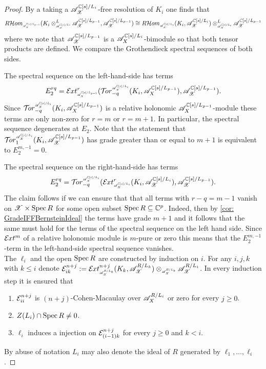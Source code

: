 \begin{proof}
  By a taking a $\mathscr{A}_{\mathscr{X}}^{\mathbb{C}[s]/L_{i}}$-free resolution of $K_i$ one finds that
  $$R \Hom_{\scaleto{\A_\X^{ \C[s]/L_{p-1} }}{8pt} }(K_i\otimes^L_{\scaleto{ \A_\X^{\C[s]/L{i}} }{8pt} } \A_\X^{\C[s]/L_{p-1} },\A_\X^{ \C[s]/L_{p-1}} ) \cong R \Hom_{ \scaleto{\A_\X^{\C[s]/L_{i}}}{8pt} } (K_i,\A_\X^{\C[s]/L_{i}}) \otimes^L_{\scaleto{ \A_\X^{\C[s]/L_{i}}}{8pt} } \A_\X^{\C[s]/L_{p-1}}$$
  where we note that $\mathscr{A}_{\mathscr{X}}^{\mathbb{C}[s]/L_{p-1}}$ is a $\mathscr{A}_X^{\mathbb{C}[s]/L_{i}}$-bimodule so that both tensor products are defined.
  We compare the Grothendieck spectral sequences of both sides.

  The spectral sequence on the left-hand-side has terms
  $$E^{rq}_2 = \Ex{\A_\X^{\C[s]/L_{p-1}}}{r}(\Tr{\A_\X^{\C[s]/L_{i}} }{-q}(K_i,\A_X^{\C[s]/L_{p-1}}),\A_\X^{\C[s]/L_{p-1}}).$$
  Since $\Tr{\A_\X^{\C[s]/L_{i}} }{-q}(K_i,\A_X^{\C[s]/L_{p-1}})$ is a relative holonomic $\mathscr{A}_X^{\mathbb{C}[s]/L_{p-1}}$-module these terms are only non-zero for $r=m$ or $r = m+1$.
  In particular, the spectral sequence degenerates at $E_2$.
  Note that the statement that $\Tr{\A_\X^{\C[s]/L_i}}{1}(K_i, \A_\X^{\C[s]/L_{p-1}})$ has grade greater than or equal to $m+1$ is equivalent to $E_2^{m,-1} = 0$.

  The spectral sequence on the right-hand-side has terms
  $$E_2^{rq} = \Tr{\A_\X^{\C[s]/L_{i}} }{-q}(\Ex{ \A_\X^{\C[s]/L_{i}} }{r} (K_i,\A_\X^{\C[s]/L_{i}}), \A_\X^{\C[s]/L_{p-1}}).$$
  The claim follows if we can ensure that that all terms with $r-q = m -1$ vanish on $\mathscr{X}\times\operatorname{Spec} R$ for some open subset $\operatorname{Spec} R\subseteq \mathbb{C}^p$.  %
  Indeed, then by \cref{cor: GradeIFFBernsteinIdeal} the terms have grade $m+1$ and it follows that the same must hold for the terms of the spectral sequence on the left hand side.
  Since $\mathcal{E}\mkern -1mu xt^{m}$ of a relative holonomic module is $m$-pure or zero this means that the $E_2^{m,-1}$-term in the left-hand-side spectral sequence vanishes.
  \\

\newpage
  The $\ell_i$ and the open $\operatorname{Spec} R$ are constructed by induction on $i$. For any $i,j,k$ with $k\leq i$ denote $\E_{ik}^{n+j}:= \Ex{\A_\X^{R/L_{k}} }{n+j}(K_k, \A_\X^{R/L_k}) \otimes_{\scaleto{\A_\X^{R/L_{k}}}{8pt}} \A_\X^{R/L_{i}}$.
  In every induction step it is ensured that
  \begin{enumerate}[label=(\roman*)]
    \item $\mathcal{E}_{ii}^{n+j}$ is $(n+j)$-Cohen-Macaulay over $\mathscr{A}_X^{R/L_i}$ or zero for every $j\geq 0$.
    \item $Z(L_i)\cap \operatorname{Spec} R \neq 0$.
    \item $\ell_i$ induces a injection on $\mathcal{E}_{(i-1)k}^{n+j}$
    for every $j\geq 0$ and $k<i$.
  \end{enumerate}
  By abuse of notation $L_i$ may also denote the ideal of $R$ generated by $\ell_1,\ldots,\ell_i$.


\end{proof}
